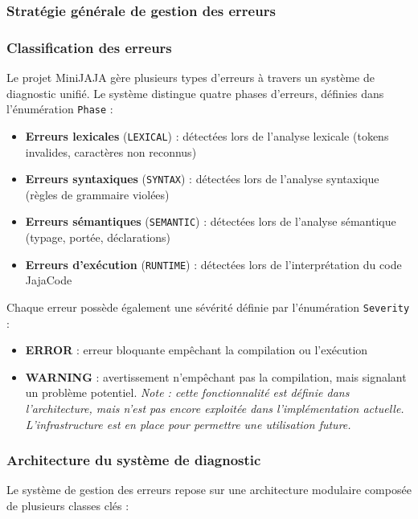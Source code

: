 \subsubsection{Stratégie générale de gestion des erreurs}\label{subsec:strategie-generale-de-gestion-des-erreurs}

\subsubsection{Classification des erreurs}
Le projet MiniJAJA gère plusieurs types d'erreurs à travers un système de diagnostic unifié.
Le système distingue quatre phases d'erreurs, définies dans l'énumération \texttt{Phase} :
\begin{itemize}
    \item \textbf{Erreurs lexicales} (\texttt{LEXICAL}) : détectées lors de l'analyse lexicale (tokens invalides, caractères non reconnus)
    \item \textbf{Erreurs syntaxiques} (\texttt{SYNTAX}) : détectées lors de l'analyse syntaxique (règles de grammaire violées)
    \item \textbf{Erreurs sémantiques} (\texttt{SEMANTIC}) : détectées lors de l'analyse sémantique (typage, portée, déclarations)
    \item \textbf{Erreurs d'exécution} (\texttt{RUNTIME}) : détectées lors de l'interprétation du code JajaCode
\end{itemize}

Chaque erreur possède également une sévérité définie par l'énumération \texttt{Severity} :
\begin{itemize}
    \item \textbf{ERROR} : erreur bloquante empêchant la compilation ou l'exécution
    \item \textbf{WARNING} : avertissement n'empêchant pas la compilation, mais signalant un problème potentiel.
    \textit{Note : cette fonctionnalité est définie dans l'architecture, mais n'est pas encore exploitée dans l'implémentation actuelle. L'infrastructure est en place pour permettre une utilisation future.}
\end{itemize}

\subsubsection{Architecture du système de diagnostic}

Le système de gestion des erreurs repose sur une architecture modulaire composée de plusieurs classes clés :

